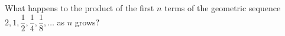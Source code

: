 What happens to the product of the first $n$ terms of the geometric sequence $2,1,\dfrac{1}{2},\dfrac{1}{4},\dfrac{1}{8},\dots$ as $n$ grows?
